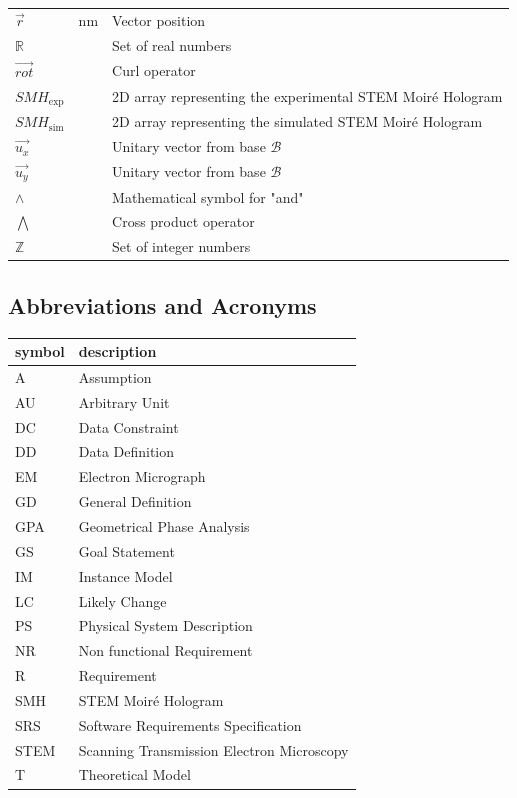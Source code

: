 \documentclass[12pt]{article}
\begin{document}
\begin{longtable*}{l l p{12cm}}
$\vec{r}$ & \si{\nano\meter} & Vector position \\
$\mathbb{R}$ & & Set of real numbers \\
$\overrightarrow{\mathit{rot}}$ & & Curl operator\\
$\mathit{SMH}_{\text{exp}}$ & & 2D array representing the experimental STEM Moir{\'e} Hologram \\
$\mathit{SMH}_{\text{sim}}$ & & 2D array representing the simulated STEM Moir{\'e} Hologram \\
$\vec{u_x}$ & & Unitary vector from base $\mathcal{B}$ \\
$\vec{u_y}$ & & Unitary vector from base $\mathcal{B}$ \\
$\wedge$ & & Mathematical symbol for "and"\\
$\bigwedge$ & & Cross product operator\\
$\mathbb{Z}$ & & Set of integer numbers\\
\bottomrule
\end{longtable*}

\subsection{Abbreviations and Acronyms}

\renewcommand{\arraystretch}{1.2}
\begin{tabular}{l l} 
  \toprule		
  \textbf{symbol} & \textbf{description}\\
  \midrule 
  A & Assumption\\
  AU & Arbitrary Unit\\
  DC & Data Constraint \\
  DD & Data Definition\\
  EM & Electron Micrograph \\
  GD & General Definition\\
  GPA & Geometrical Phase Analysis \\
  GS & Goal Statement\\
  IM & Instance Model\\
  LC & Likely Change\\
  PS & Physical System Description\\
  NR & Non functional Requirement\\
  R & Requirement\\
  SMH & STEM Moir{\'e} Hologram \\
  SRS & Software Requirements Specification\\
  STEM & Scanning Transmission Electron Microscopy \\
  T & Theoretical Model\\
  \bottomrule
\end{tabular}
\end{document}
